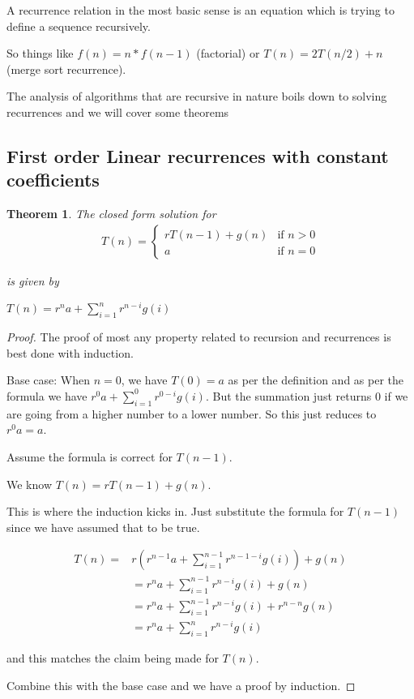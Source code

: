 \documentclass[12pt]{article}
\newtheorem{theorem}{Theorem}
\begin{document}
A recurrence relation in the most basic sense is an equation which is trying to define a sequence recursively.

So things like $f(n) = n * f(n-1)$ (factorial) or $T(n) = 2T(n/2) + n$ (merge sort recurrence). 

The analysis of algorithms that are recursive in nature boils down to solving recurrences and we will cover some theorems

\subsection*{First order Linear recurrences with constant coefficients}

\begin{theorem}
The closed form solution for
\begin{align*}
T(n) = \begin{cases}
rT(n-1) + g(n) & \mbox{if } n > 0\\
a & \mbox{if } n = 0
\end{cases}
\end{align*}

is given by

$T(n) = r^n a + \sum_{i=1}^n r^{n-i} g(i)$

\end{theorem}

\begin{proof}
The proof of most any property related to recursion and recurrences is best done with induction. 

Base case: When $n=0$, we have $T(0)= a$ as per the definition and as per the formula we have $r^0 a + \sum_{i=1}^0 r^{0-i}g(i)$. But the summation just returns 0 if we are going from a higher number to a lower number. So this just reduces to $r^0 a = a$.

Assume the formula is correct for $T(n-1)$.

We know $T(n) = rT(n-1) + g(n)$.

This is where the induction kicks in. Just substitute the formula for $T(n-1)$ since we have assumed that to be true.

\begin{align*}
T(n) = 
&r (r^{n-1} a + \sum_{i=1}^{n-1} r^{n-1-i} g(i)) + g(n) \\
&= r^n a + \sum_{i=1}^{n-1} r^{n-i} g(i) + g(n) \\
&= r^n a + \sum_{i=1}^{n-1} r^{n-i} g(i) + r^{n-n}g(n) \\
&= r^n a + \sum_{i=1}^{n} r^{n-i} g(i) 
\end{align*}

and this matches the claim being made for $T(n)$.

Combine this with the base case and we have a proof by induction.

\end{proof}
\end{document}
